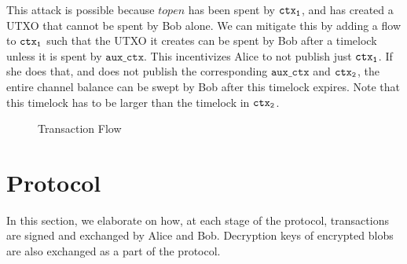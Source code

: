 This attack is possible because $topen$ has been spent by $\texttt{ctx\textsubscript{1}}$, and has created a UTXO that cannot be spent by Bob alone. We can mitigate this by adding a flow to $\texttt{ctx\textsubscript{1}}$ such that the UTXO it creates can be spent by Bob after a timelock unless it is spent by $\texttt{aux\_ctx}$. This incentivizes Alice to not publish just $\texttt{ctx\textsubscript{1}}$. If she does that, and does not publish the corresponding $\texttt{aux\_ctx}$ and $\texttt{ctx\textsubscript{2}}$, the entire channel balance can be swept by Bob after this timelock expires. Note that this timelock has to be larger than the timelock in $\texttt{ctx\textsubscript{2}}$. 

\begin{figure}[H]
\begin{centering}
\caption{Transaction Flow}
\label{transaction_flow}
\end{centering} 
\end{figure}

\section{Protocol} \label{protocol}
In this section, we elaborate on how, at each stage of the protocol, transactions are signed and exchanged by Alice and Bob. Decryption keys of encrypted blobs are also exchanged as a part of the protocol.

